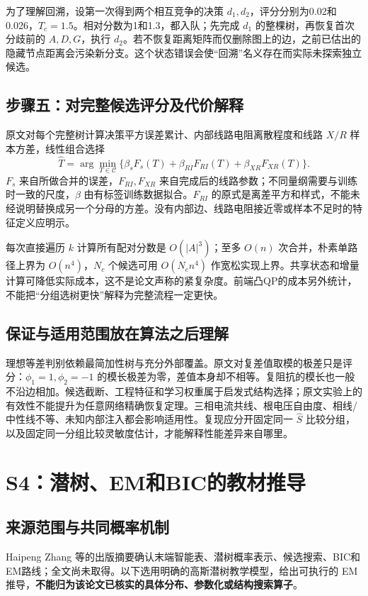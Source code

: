 \documentclass[UTF8,11pt,fontset=fandol,openany,oneside]{ctexbook}
\theoremstyle{definition}
\theoremstyle{remark}
\numberwithin{equation}{chapter}
\begin{document}
为了理解回溯，设第一次得到两个相互竞争的决策 $d_1,d_2$，评分分别为0.02和0.026，$T_c=1.5$。相对分数为1和1.3，都入队；先完成 $d_1$ 的整棵树，再恢复首次分歧前的 $A,D,G$，执行 $d_2$。若不恢复距离矩阵而仅删除图上的边，之前已估出的隐藏节点距离会污染新分支。这个状态错误会使“回溯”名义存在而实际未探索独立候选。

\subsection{步骤五：对完整候选评分及代价解释}
原文对每个完整树计算决策平方误差累计、内部线路电阻离散程度和线路 $X/R$ 样本方差，线性组合选择
\begin{equation}
 \widehat T=\arg\min_{T\in\mathcal C}
 \{\beta_sF_s(T)+\beta_{RI}F_{RI}(T)+\beta_{XR}F_{XR}(T)\}.
\end{equation}
$F_s$ 来自所做合并的误差，$F_{RI},F_{XR}$ 来自完成后的线路参数；不同量纲需要与训练时一致的尺度，$\beta$ 由有标签训练数据拟合。$F_{RI}$ 的原式是离差平方和样式，不能未经说明替换成另一个分母的方差。没有内部边、线路电阻接近零或样本不足时的特征定义应明示。

每次直接遍历 $k$ 计算所有配对分数是 $O(|A|^3)$；至多 $O(n)$ 次合并，朴素单路径上界为 $O(n^4)$，$N_c$ 个候选可用 $O(N_cn^4)$ 作宽松实现上界。共享状态和增量计算可降低实际成本，这不是论文声称的紧复杂度。前端凸QP的成本另外统计，不能把“分组选树更快”解释为完整流程一定更快。

\subsection{保证与适用范围放在算法之后理解}
理想等差判别依赖最简加性树与充分外部覆盖。原文对复差值取模的极差只是评分：$\phi_1=1,\phi_2=-1$ 的模长极差为零，差值本身却不相等。复阻抗的模长也一般不沿边相加。候选截断、工程特征和学习权重属于启发式结构选择；原文实验上的有效性不能提升为任意网络精确恢复定理。三相电流共线、根电压自由度、相线/中性线不等、未知内部注入都会影响适用性。复现应分开固定同一 $\widehat S$ 比较分组，以及固定同一分组比较灵敏度估计，才能解释性能差异来自哪里。

\section{S4：潜树、EM和BIC的教材推导}
\subsection{来源范围与共同概率机制}
Haipeng Zhang 等\citep{S4}的出版摘要确认末端智能表、潜树概率表示、候选搜索、BIC和EM路线；全文尚未取得。以下选用明确的高斯潜树教学模型，给出可执行的 EM 推导，\textbf{不能归为该论文已核实的具体分布、参数化或结构搜索算子}。
\end{document}

